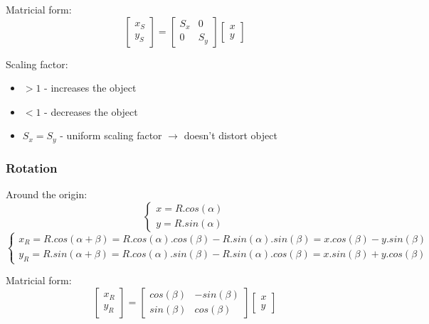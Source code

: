 \documentclass[a4paper]{article}
\begin{document}
\begin{flushleft}
Matricial form:
\begin{equation}
\begin{bmatrix}
	x_S \\
	y_S
\end{bmatrix}
=
\begin{bmatrix}
	S_x & 0 \\
	0 & S_y
\end{bmatrix}
\begin{bmatrix}
	x \\
	y
\end{bmatrix}
\end{equation}

Scaling factor:
\begin{itemize}
	\item $>1$ - increases the object
	\item $<1$ - decreases the object
	\item $S_x=S_y$ - uniform scaling factor $\rightarrow$ doesn't distort object
\end{itemize}

\subsubsection{Rotation}
Around the origin:
\begin{equation}
\begin{cases}
	x = R.cos(\alpha) \\
	y = R.sin(\alpha)
\end{cases}
\end{equation}
\begin{equation}
\begin{cases}
	x_R = R.cos(\alpha+\beta) = R.cos(\alpha).cos(\beta) - R.sin(\alpha).sin(\beta)= x.cos(\beta) - y.sin(\beta) \\
	y_R = R.sin(\alpha+\beta) = R.cos(\alpha).sin(\beta) - R.sin(\alpha).cos(\beta)= x.sin(\beta) + y.cos(\beta)
\end{cases}
\end{equation}

Matricial form:
\begin{equation}
\begin{bmatrix}
	x_R \\
	y_R
\end{bmatrix}
=
\begin{bmatrix}
	cos(\beta) & -sin(\beta) \\
	sin(\beta) & cos(\beta)
\end{bmatrix}
\begin{bmatrix}
	x \\
	y
\end{bmatrix}
\end{equation}


\end{flushleft}
\end{document}
